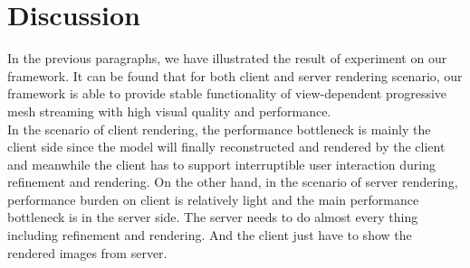 \section{Discussion}
\label{section:results:discussion}
In the previous paragraphs, we have illustrated the result of experiment on our framework. It can be found that for both client and server rendering scenario, our framework is able to provide stable functionality of view-dependent progressive mesh streaming with high visual quality and performance. \\

In the scenario of client rendering, the performance bottleneck is mainly the client side since the model will finally reconstructed and rendered by the client and meanwhile the client has to support interruptible user interaction during refinement and rendering. On the other hand, in the scenario of server rendering, performance burden on client is relatively light and the main performance bottleneck is in the server side. The server needs to do almost every thing including refinement and rendering. And the client just have to show the rendered images from server. \\ 





